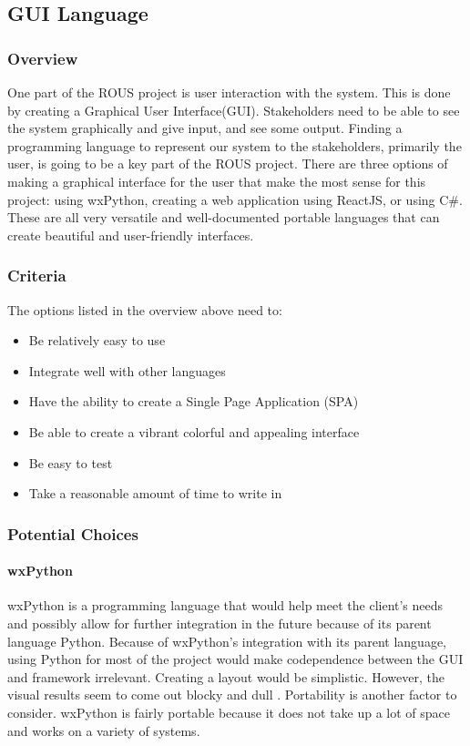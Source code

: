 

\subsection{GUI Language}
\subsubsection{Overview}
One part of the ROUS project is user interaction with the system. This is done by creating a Graphical User Interface(GUI). Stakeholders need to be able to see the system graphically and give input, and see some output. Finding a programming language to represent our system to the stakeholders, primarily the user, is going to be a key part of the ROUS project. There are three options of making a graphical interface for the user that make the most sense for this project: using wxPython, creating a web application using ReactJS, or using C\#. These are all very versatile and well-documented portable languages that can create beautiful and user-friendly interfaces.


\subsubsection{Criteria}
The options listed in the overview above need to:
\begin{itemize}
	\item Be relatively easy to use
    \item Integrate well with other languages
    \item Have the ability to create a Single Page Application (SPA)
    \item Be able to create a vibrant colorful and appealing interface
    \item Be easy to test
    \item Take a reasonable amount of time to write in
\end{itemize}
\subsubsection{Potential Choices}
\paragraph{wxPython}
wxPython is a programming language that would help meet the client's needs and possibly allow for further integration in the future because of its parent language Python. Because of wxPython's integration with its parent language, using Python for most of the project would make codependence between the GUI and framework irrelevant. Creating a layout would be simplistic. However, the visual results seem to come out blocky and dull \cite{wxPython}. Portability is another factor to consider. wxPython is fairly portable because it does not take up a lot of space and works on a variety of systems. 
